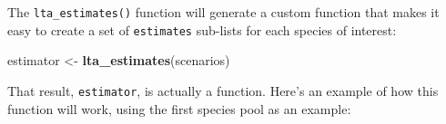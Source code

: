 \documentclass[
]{book}
\newenvironment{Shaded}{\begin{snugshade}}{\end{snugshade}}
\newcommand{\AttributeTok}[1]{\textcolor[rgb]{0.13,0.29,0.53}{#1}}
\newcommand{\DecValTok}[1]{\textcolor[rgb]{0.00,0.00,0.81}{#1}}
\newcommand{\FunctionTok}[1]{\textcolor[rgb]{0.13,0.29,0.53}{\textbf{#1}}}
\newcommand{\NormalTok}[1]{#1}
\newcommand{\OtherTok}[1]{\textcolor[rgb]{0.56,0.35,0.01}{#1}}
\newcommand{\SpecialCharTok}[1]{\textcolor[rgb]{0.81,0.36,0.00}{\textbf{#1}}}
\newcommand{\StringTok}[1]{\textcolor[rgb]{0.31,0.60,0.02}{#1}}
\begin{document}
The \texttt{lta\_estimates()} function will generate a custom function that makes it easy to create a set of \texttt{estimates} sub-lists for each species of interest:

\begin{Shaded}
\begin{Highlighting}[]
\NormalTok{estimator }\OtherTok{\textless{}{-}} \FunctionTok{lta\_estimates}\NormalTok{(scenarios)}
\end{Highlighting}
\end{Shaded}

That result, \texttt{estimator}, is actually a function. Here's an example of how this function will work, using the first species pool as an example:

\begin{Shaded}
\end{Shaded}
\end{document}
